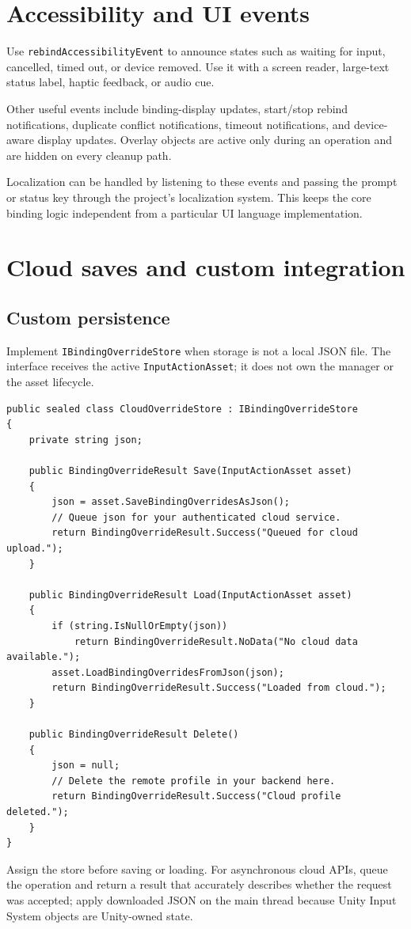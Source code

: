 \documentclass[11pt,a4paper]{article}
\newcommand{\class}[1]{\texttt{#1}}
\begin{document}
\section{Accessibility and UI events}
Use \class{rebindAccessibilityEvent} to announce states such as waiting for input, cancelled, timed out, or device removed. Use it with a screen reader, large-text status label, haptic feedback, or audio cue.

Other useful events include binding-display updates, start/stop rebind notifications, duplicate conflict notifications, timeout notifications, and device-aware display updates. Overlay objects are active only during an operation and are hidden on every cleanup path.

Localization can be handled by listening to these events and passing the prompt or status key through the project's localization system. This keeps the core binding logic independent from a particular UI language implementation.

\section{Cloud saves and custom integration}
\subsection{Custom persistence}
Implement \class{IBindingOverrideStore} when storage is not a local JSON file. The interface receives the active \class{InputActionAsset}; it does not own the manager or the asset lifecycle.
\begin{lstlisting}[style=csharp]
public sealed class CloudOverrideStore : IBindingOverrideStore
{
    private string json;

    public BindingOverrideResult Save(InputActionAsset asset)
    {
        json = asset.SaveBindingOverridesAsJson();
        // Queue json for your authenticated cloud service.
        return BindingOverrideResult.Success("Queued for cloud upload.");
    }

    public BindingOverrideResult Load(InputActionAsset asset)
    {
        if (string.IsNullOrEmpty(json))
            return BindingOverrideResult.NoData("No cloud data available.");
        asset.LoadBindingOverridesFromJson(json);
        return BindingOverrideResult.Success("Loaded from cloud.");
    }

    public BindingOverrideResult Delete()
    {
        json = null;
        // Delete the remote profile in your backend here.
        return BindingOverrideResult.Success("Cloud profile deleted.");
    }
}
\end{lstlisting}
Assign the store before saving or loading. For asynchronous cloud APIs, queue the operation and return a result that accurately describes whether the request was accepted; apply downloaded JSON on the main thread because Unity Input System objects are Unity-owned state.
\end{document}
